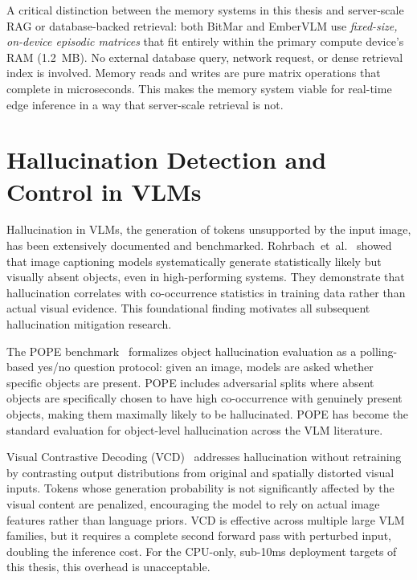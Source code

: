 A critical distinction between the memory systems in this thesis and server-scale RAG or database-backed retrieval: both BitMar and EmberVLM use \emph{fixed-size, on-device episodic matrices} that fit entirely within the primary compute device's RAM (1.2~MB). No external database query, network request, or dense retrieval index is involved. Memory reads and writes are pure matrix operations that complete in microseconds. This makes the memory system viable for real-time edge inference in a way that server-scale retrieval is not.

\section{Hallucination Detection and Control in VLMs}
\label{sec:related_hallucination}

Hallucination in VLMs, the generation of tokens unsupported by the input image, has been extensively documented and benchmarked. Rohrbach~et~al.~\cite{rohrbach2018hallucination} showed that image captioning models systematically generate statistically likely but visually absent objects, even in high-performing systems. They demonstrate that hallucination correlates with co-occurrence statistics in training data rather than actual visual evidence. This foundational finding motivates all subsequent hallucination mitigation research.

The POPE benchmark~\cite{li2023pope} formalizes object hallucination evaluation as a polling-based yes/no question protocol: given an image, models are asked whether specific objects are present. POPE includes adversarial splits where absent objects are specifically chosen to have high co-occurrence with genuinely present objects, making them maximally likely to be hallucinated. POPE has become the standard evaluation for object-level hallucination across the VLM literature.

Visual Contrastive Decoding (VCD)~\cite{leng2024vcd} addresses hallucination without retraining by contrasting output distributions from original and spatially distorted visual inputs. Tokens whose generation probability is not significantly affected by the visual content are penalized, encouraging the model to rely on actual image features rather than language priors. VCD is effective across multiple large VLM families, but it requires a complete second forward pass with perturbed input, doubling the inference cost. For the CPU-only, sub-10ms deployment targets of this thesis, this overhead is unacceptable.

